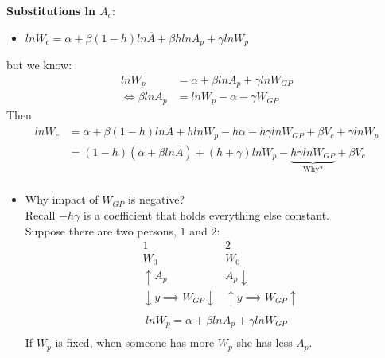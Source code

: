 \documentclass[14pt,notitlepage]{article}
\begin{document}
\textbf{Substitutions ln $A_c$}:
\begin{itemize}
\item $ln W_c = \alpha + \beta (1-h) ln \overline{A} + \beta h ln A_p + \gamma ln W_p$
\end{itemize}
but we know:
\begin{align*}
ln W_p &= \alpha + \beta ln A_p + \gamma ln W_{GP} \\
\Leftrightarrow \beta ln A_p &= ln W_p - \alpha - \gamma W_{GP}
\end{align*}
Then
\begin{align*}
ln W_c &= \alpha + \beta (1-h) ln \overline{A} + h ln W_p - h \alpha - h \gamma ln W_{GP} + \beta V_c + \gamma ln W_p \\
&= (1-h)(\alpha + \beta ln \overline{A}) + (h+\gamma)ln W_p - \underbrace{h \gamma ln W_{GP}}_{\text{Why?}} + \beta V_c \\
\end{align*}

\begin{itemize}
\item Why impact of $W_{GP}$ is negative? \\
Recall $-h \gamma$ is a coefficient that holds everything else constant. \\
Suppose there are two persons, $1$ and $2$:
\begin{align*}
&1 \quad &2 \\
&W_0 &W_0 \\
&\uparrow A_p &A_p \downarrow \\
&\downarrow y \implies W_{GP}\downarrow &\uparrow y \implies W_{GP}\uparrow\\
\end{align*}
\begin{align*}
ln W_p = \alpha + \beta ln A_p + \gamma ln W_{GP}\\
\end{align*}
If $W_p$ is fixed, when someone has more $W_p$ she has less $A_p$.
\end{itemize}
\end{document}
